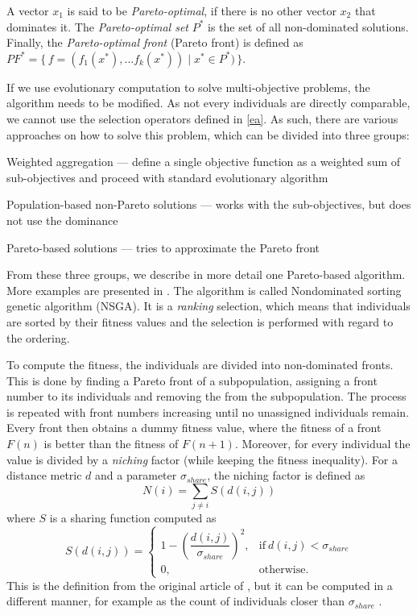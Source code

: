 \begin{definition}
A vector $x_1$ is said to be \emph{Pareto-optimal}, if there is no other vector
$x_2$ that dominates it. The \emph{Pareto-optimal set} $P^*$ is the set of all
non-dominated solutions. Finally, the \emph{Pareto-optimal front} (Pareto front)
is defined as
$PF^* =\{\, f=(f_1(x^*),\ldots f_k(x^*)) \mid x^* \in P^* ) \,\}$. 
\end{definition}

If we use evolutionary computation to solve multi-objective problems, the
algorithm needs to be modified. As not every individuals are directly
comparable, we cannot use the selection operators defined in
\ref{ea}. As such, there are various approaches on how to solve this problem,
which can be divided into three groups:

\begin{compactitem}
\item Weighted aggregation --- define a single objective function as a weighted
sum of sub-objectives and proceed with standard evolutionary algorithm
\item Population-based non-Pareto solutions --- works with the sub-objectives,
but does not use the dominance
\item Pareto-based solutions --- tries to approximate the Pareto front
\end{compactitem}

From these three groups, we describe in more detail one Pareto-based algorithm.
More examples are presented in 
\cite[p.~170-173]{Engelbrecht:2007:CII:1557464}.
The algorithm is called Nondominated sorting genetic algorithm (NSGA). It is a
\emph{ranking} selection, which means that individuals are sorted by their
fitness values and the selection is performed with regard to the ordering.

To compute the fitness, the individuals are divided into non-dominated fronts.
This is done by finding a Pareto front of a subpopulation, assigning a
front number to its individuals and removing the from the subpopulation.
The process is repeated with front numbers increasing until no unassigned
individuals remain. Every front then obtains a dummy fitness value, where
the fitness of a front $F(n)$ is better than the fitness of $F(n+1)$. Moreover,
for every individual the value is divided by a \emph{niching} factor (while
keeping the fitness inequality). For a distance metric $d$ and a parameter
$\sigma_{share}$, the niching factor is defined as
$$N(i)=\sum_{j\neq i}{S(d(i,j))}$$ where $S$ is a sharing function computed as
\begin{equation}
    S(d(i,j))=
    \begin{cases}
      1 - \left(\dfrac{d(i,j)}{\sigma_{share}}\right)^2, & \text{if}\ d(i,j) < \sigma_{share} \\
      0, & \text{otherwise.}
    \end{cases}
\end{equation}
This is the definition from the original article of
\cite{Srinivas:1994:MOU:1326668.1326671}, but it can be computed in a different
manner, for example as the count of individuals closer than $\sigma_{share}$
\citep{Engelbrecht:2007:CII:1557464}.

